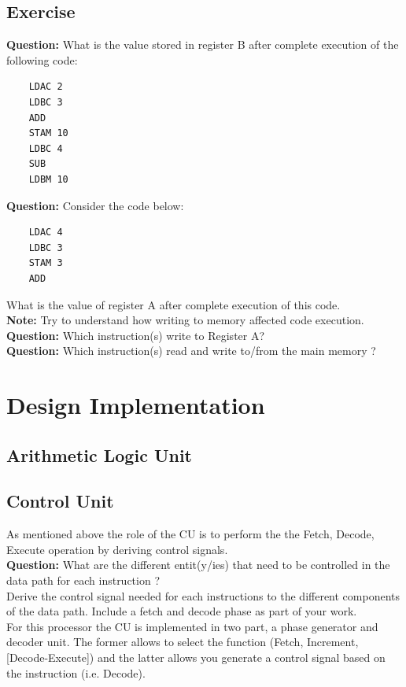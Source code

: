 \documentclass[a4paper, 11pt]{article}
\begin{document}
\subsection{Exercise}

\textbf{Question:} What is the value stored in register B after complete execution of the following code:
\begin{lstlisting}
    LDAC 2
    LDBC 3
    ADD
    STAM 10
    LDBC 4
    SUB
    LDBM 10
\end{lstlisting}
\textbf{Question:} Consider the code below:
\begin{lstlisting}
    LDAC 4
    LDBC 3
    STAM 3
    ADD
\end{lstlisting}
What is the value of register A after complete execution of this code.\\
\textbf{Note:} Try to understand how writing to memory affected code execution.\\
\textbf{Question:} Which instruction(s) write to Register A?\\
\textbf{Question:} Which instruction(s) read and write to/from the main memory ?\\
\section{Design Implementation}
\subsection{Arithmetic Logic Unit}
\subsection{Control Unit}
As mentioned above the role of the CU is to perform the the Fetch, Decode, Execute operation by deriving control signals. \\
\textbf{Question:} What are the different entit(y/ies) that need to be controlled in the data path for each instruction ? \\ 
Derive the control signal needed for each instructions to the different components of the data path. Include a fetch and decode phase as part of your work. \\
For this processor the CU is implemented in two part, a phase generator and decoder unit. The former allows to select the function (Fetch, Increment, [Decode-Execute]) and the latter allows you generate a control signal based on the instruction (i.e. Decode).
\end{document}
